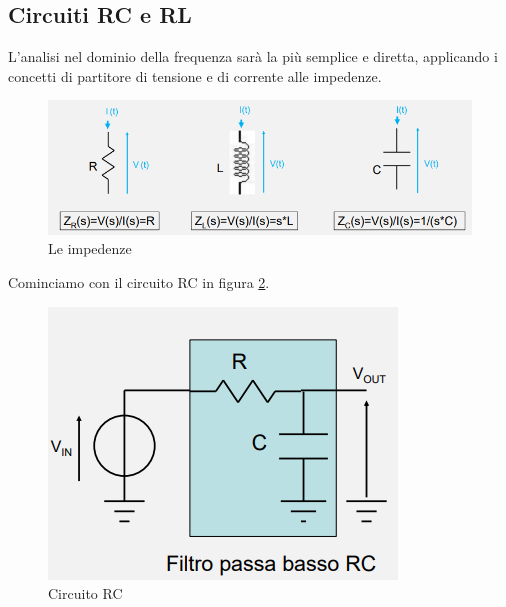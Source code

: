 \documentclass{article}
\begin{document}
\subsection{Circuiti RC e RL}

L'analisi nel dominio della frequenza sarà la più semplice e diretta, applicando i concetti di partitore di tensione e di corrente alle impedenze.

\begin{figure}[h]
  \centering
  \includegraphics[scale=0.7]{IM_impedenze_bis}
  \caption{Le impedenze}
  \label{Schema_impedenze_bis}
\end{figure}

Cominciamo con il circuito RC in figura \ref{Schema_circuito_RC_passivo}.
\begin{figure}[h]
  \centering
  \includegraphics[scale=0.7]{IM_circuito_RC_passivo}
  \caption{Circuito RC}
  \label{Schema_circuito_RC_passivo}
\end{figure}
\end{document}
